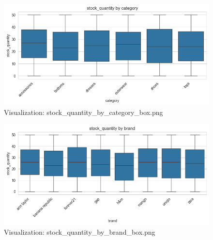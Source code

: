 \documentclass{article}%
\begin{document}
\begin{minipage}[c]{0.48\textwidth}%


\begin{figure}[H]%
\centering%
\includegraphics[width=\linewidth]{output/plots/stock_quantity_by_category_box.png}%
\caption{Visualization: stock\_quantity\_by\_category\_box.png}%
\end{figure}

%
\end{minipage}%
\begin{minipage}[c]{0.48\textwidth}%


\begin{figure}[H]%
\centering%
\includegraphics[width=\linewidth]{output/plots/stock_quantity_by_brand_box.png}%
\caption{Visualization: stock\_quantity\_by\_brand\_box.png}%
\end{figure}

%
\end{minipage}%
\vspace{10pt}%
\\%
\end{document}
